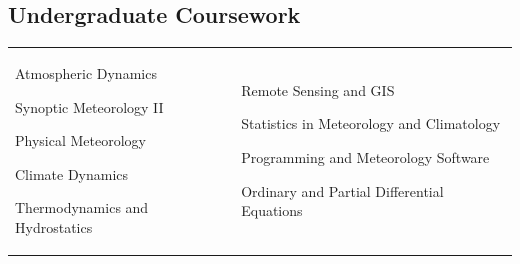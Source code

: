 \documentclass[margin,line,palatino,courier,10pt]{res}
\newenvironment{list1}{
  \begin{list}{\ding{113}}{%
      \setlength{\itemsep}{0in}
      \setlength{\parsep}{0in} \setlength{\parskip}{0in}
      \setlength{\topsep}{0in} \setlength{\partopsep}{0in}
      \setlength{\leftmargin}{0.17in}}}{\end{list}}
\begin{document}
\begin{resume}
\section{\sc \textcolor{Cerulean}{\large{\textbf{Undergraduate Coursework}}}}
\vspace{-0.1in}
\begin{tabular}{@{}p{2.2in}p{3in}}
\vspace*{0.04in}
\begin{list1}
\item Atmospheric Dynamics
\item Synoptic Meteorology II
\item Physical Meteorology
\item Climate Dynamics
\item Thermodynamics and Hydrostatics 
\end{list1}
&
\begin{list1}
\item Remote Sensing and GIS
\item Statistics in Meteorology and Climatology
\item Programming and Meteorology Software
\item Ordinary and Partial Differential Equations
\end{list1}

\end{tabular}

\vspace{-0.1in}
\noindent\textcolor{Cerulean}{\makebox[\linewidth][r]{\rule{\textwidth}{5pt}}}
\vspace{-0.3in}


\end{resume}
\end{document}
